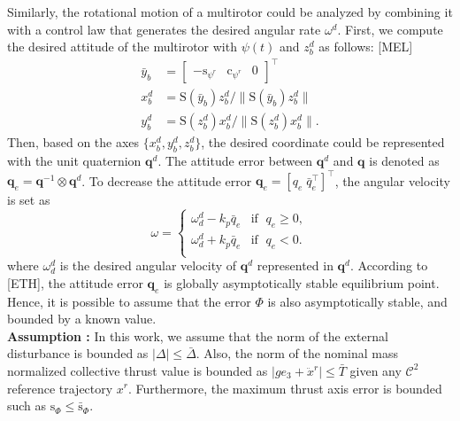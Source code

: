 \documentclass[letterpaper, 10 pt, conference]{ieeeconf}  %
\begin{document}
Similarly, the rotational motion of a multirotor could be analyzed by combining it with a control law that generates the desired angular rate $\omega^d$. 
First, we compute the desired attitude of the multirotor with $\psi(t)$ and $z_b^d$ as follows: [MEL]
\begin{align}
\bar{y}_b &= [\begin{array}{ccc}-\text{s}_{\psi^r}&\text{c}_{\psi^r}&0\end{array}]^\intercal \nonumber \\
x_b^d &= \text{S}(\bar{y}_b)z_b^d / \|\text{S}(\bar{y}_b)z_b^d \| \nonumber \\ 
y_b^d &= \text{S}({z}_b^d)x_b^d / \|\text{S}(z_b^d)x_b^d \|. \nonumber  
\end{align}
Then, based on the axes $\{x_b^d,y_b^d,z_b^d\}$, the desired coordinate could be represented with the unit quaternion $\textbf{q}^d$. 
The attitude error between $\textbf{q}^d$ and $\textbf{q}$ is denoted as $\textbf{q}_e = \textbf{q}^{-1}\otimes \textbf{q}^d$. To decrease the attitude error $\textbf{q}_e = [q_e\;\bar{q}_e^\intercal]^\intercal$, the angular velocity is set as 
\begin{equation}
\omega = \left\{
\begin{array}{ll}
\omega_d^d - k_p \bar{q}_e & \text{if  }\;q_e \geq 0, \\ 
\omega_d^d + k_p \bar{q}_e & \text{if  }\;q_e < 0. \\ 
\end{array}
\right.
\end{equation}
where $\omega_d^d$ is the desired angular velocity of $\textbf{q}^d$ represented in $\textbf{q}^d$.
According to [ETH], the attitude error $\textbf{q}_e$ is globally asymptotically stable equilibrium point. 
Hence, it is possible to assume that the error $\Phi$ is also asymptotically stable, and bounded by a known value.
\\
\textbf{Assumption : }
In this work, we assume that the norm of the external disturbance is bounded as $|\Delta| \leq \bar{\Delta}$. 
Also, the norm of the nominal mass normalized collective thrust value is bounded as $|ge_3 + \ddot{x}^r| \leq \bar{T}$ given any $\mathcal{C}^2$ reference trajectory $x^r$.  
Furthermore, the maximum thrust axis error is bounded such as $\text{s}_\Phi \leq \bar{\text{s}}_\Phi$.
\end{document}
